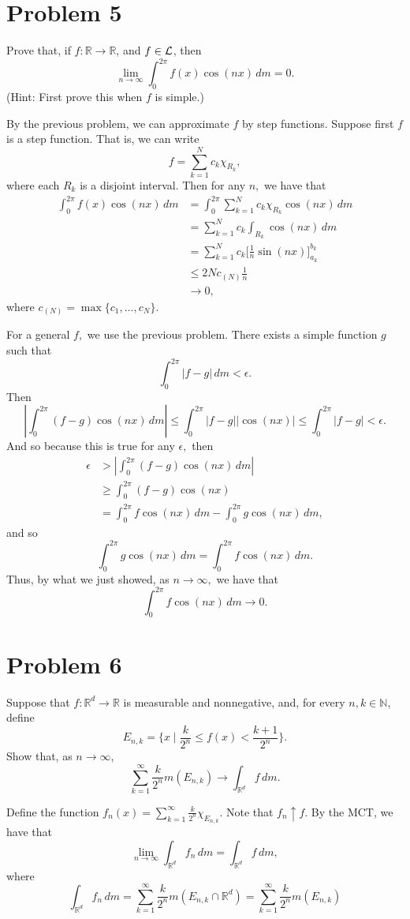 \documentclass[11pt]{article}
\newcommand{\bbR}{\mathbb{R}}
\begin{document}
\newpage
\section*{Problem 5}
Prove that, if \( f: \mathbb{R} \to \mathbb{R} \), and \( f \in \cal L \), then
\[
\lim_{n \to \infty} \int_{0}^{2\pi} f(x) \cos(nx) \, dm = 0.
\]
(Hint: First prove this when \( f \) is simple.)
\begin{solution}
By the previous problem, we can approximate $f$ by step functions. Suppose first $f$ is a step function. That is, we can write 
\[f = \sum_{k= 1}^N c_k \chi_{R_k},\] where each $R_k$ is a disjoint interval. Then for any $n,$ we have that
\begin{align*}
    \int_{0}^{2\pi} f(x)\cos(nx) \, dm &= \int_{0}^{2\pi} \sum_{k=1}^N c_k \chi_{R_k}\cos(nx) \, dm\\
    &= \sum_{k=1}^N c_k\int_{R_k} \cos(nx)\, dm\\
    &= \sum_{k=1}^N c_k \bigg[\frac{1}{n}\sin(nx)\bigg]_{a_k}^{b_k}\\
    &\leq 2 Nc_{(N)} \frac{1}{n}\\
    &\to 0,
\end{align*}
where $c_{(N)} = \max\{c_1, \dots, c_N\}.$ 

For a general $f,$ we use the previous problem. There exists a simple function $g$ such that 
\[\int_{0}^{2\pi} |f - g|\, dm < \epsilon.\] Then 
\[\left|\int_0^{2\pi} (f - g)\cos(nx)\, dm\right| \leq \int_0^{2\pi} |f - g||\cos(nx)| \leq \int_0^{2\pi} |f-g| < \epsilon.\] And so because this is true for any $\epsilon,$ then
\begin{align*}
\epsilon &>\left|\int_0^{2\pi} (f - g)\cos(nx)\, dm\right|\\
& \geq \int_0^{2\pi} (f - g)\cos(nx)\\
&= \int_0^{2\pi} f \cos(nx)\, dm - \int_0^{2\pi} g \cos(nx)\, dm,
\end{align*}
and so \[\int_0^{2\pi} g \cos(nx)\, dm = \int_0^{2\pi} f \cos(nx)\, dm.\] Thus, by what we just showed, as $n\to \infty,$ we have that 
\[\int_0^{2\pi} f \cos(nx)\, dm \to 0.\]


    
\end{solution}


\newpage
\section*{Problem 6}
Suppose that \( f: \mathbb{R}^d \to \mathbb{R} \) is measurable and nonnegative, and, for every \( n, k \in \mathbb{N} \), define
\[
E_{n,k} = \{x \mid \frac{k}{2^n} \leq f(x) < \frac{k+1}{2^n}\}.
\]
Show that, as \( n \to \infty \),
\[
\sum_{k=1}^{\infty} \frac{k}{2^n}m(E_{n,k}) \to \int_{\mathbb{R}^d} f \, dm.
\]
\begin{solution}
    Define the function $f_{n}(x) = \sum_{k=1}^\infty \frac{k}{2^n}\chi_{E_{n,k}}.$ Note that $f_n \uparrow f.$ By the MCT, we have that
    \[\lim_{n\to \infty}\int_{\bbR^d} f_n \, dm = \int_{\bbR^d} f \, dm,\] where 
    \[\int_{\bbR^d} f_{n} \, dm = \sum_{k=1}^\infty \frac{k}{2^n}m(E_{n,k} \cap \bbR^d) = \sum_{k=1}^\infty \frac{k}{2^n}m(E_{n,k}) \]
\end{solution}
\end{document}
